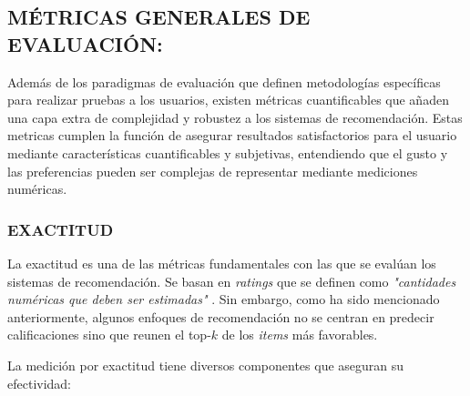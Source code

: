 \newpage
\thispagestyle{plain}
\vspace*{0.2cm}

\subsection{MÉTRICAS GENERALES DE EVALUACIÓN: }

Además de los paradigmas de evaluación que definen metodologías específicas para realizar pruebas a los usuarios, existen métricas cuantificables que añaden una capa extra de complejidad y robustez a los sistemas de recomendación. Estas metricas cumplen la función de asegurar resultados satisfactorios para el usuario mediante características cuantificables y subjetivas, entendiendo que el gusto y las preferencias pueden ser complejas de representar mediante mediciones numéricas.

    \subsubsection{EXACTITUD}

    La exactitud es una de las métricas fundamentales con las que se evalúan los sistemas de recomendación. Se basan en \textit{ratings} que se definen como \textit{"cantidades numéricas que deben ser estimadas" } \parencite{Aggarwal2016}. Sin embargo, como ha sido mencionado anteriormente, algunos enfoques de recomendación no se centran en predecir calificaciones sino que reunen el top-$k$ de los \textit{items} más favorables. 

    La medición por exactitud tiene diversos componentes que aseguran su efectividad:

